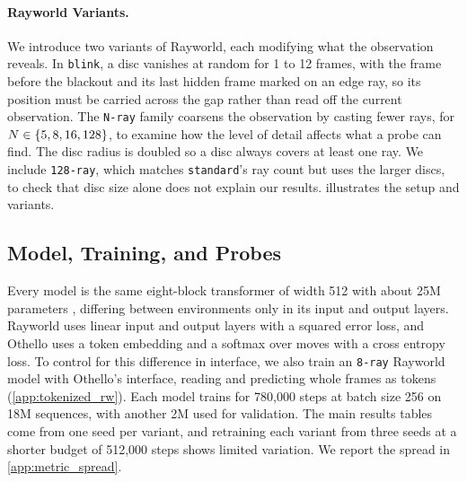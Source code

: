 \documentclass{article} %
\DeclarePairedDelimiter{\set}{\{}{\}}
\begin{document}
\paragraph{Rayworld Variants.}
We introduce two variants of Rayworld, each modifying what the observation reveals. In \texttt{blink}, a disc vanishes at random for 1 to 12 frames, with the frame before the blackout and its last hidden frame marked on an edge ray, so its position must be carried across the gap rather than read off the current observation. The \texttt{N-ray} family coarsens the observation by casting fewer rays, for $N \in \set{5, 8, 16, 128}$, to examine how the level of detail affects what a probe can find. The disc radius is doubled so a disc always covers at least one ray. We include \texttt{128-ray}, which matches \texttt{standard}'s ray count but uses the larger discs, to check that disc size alone does not explain our results.  illustrates the setup and variants.

\subsection{Model, Training, and Probes}
Every model is the same eight-block transformer of width 512 with about 25M parameters \citep{vaswani2017attention}, differing between environments only in its input and output layers. Rayworld uses linear input and output layers with a squared error loss, and Othello uses a token embedding and a softmax over moves with a cross entropy loss. To control for this difference in interface, we also train an \texttt{8-ray} Rayworld model with Othello's interface, reading and predicting whole frames as tokens (\cref{app:tokenized_rw}). Each model trains for 780,000 steps at batch size 256 on 18M sequences, with another 2M used for validation. The main results tables come from one seed per variant, and retraining each variant from three seeds at a shorter budget of 512,000 steps shows limited variation. We report the spread in \cref{app:metric_spread}.

\end{document}

